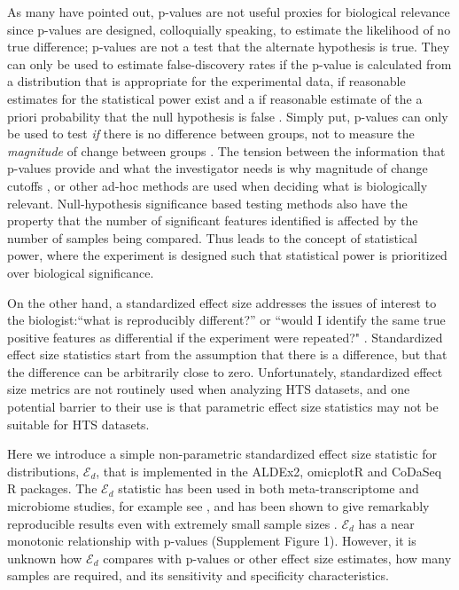 \documentclass{bioinfo}
\begin{document}

As many have pointed out, p-values are not useful proxies for biological relevance since p-values are designed, colloquially speaking, to estimate the likelihood of no true difference; p-values are not a test that the alternate hypothesis is true. They can only be used to estimate false-discovery rates if the p-value is calculated from a distribution that is appropriate for the experimental data, if reasonable estimates for the statistical power exist and a if reasonable estimate of the a priori probability that the null hypothesis is false \citep{Colquhoun:2014aa, Halsey:2015aa}. Simply put, p-values can only be used to test \emph{if} there is no difference between groups, not to measure the \emph{magnitude} of change between groups \citep{coe2002s,Colquhoun:2014aa}. The tension between the information that p-values provide and what the investigator needs is why magnitude of change cutoffs \citep{Cui:2003aa}, or other ad-hoc methods are used when deciding what is biologically relevant. Null-hypothesis significance based testing methods  also have the property that the number of significant features identified  is affected by the number of samples being compared. Thus leads to the concept of statistical power, where the experiment is designed such that statistical power is prioritized over biological significance. 

On the other hand, a standardized effect size addresses the issues of interest to the biologist:``what is reproducibly different?'' or ``would I identify the same true positive features as differential if the experiment were repeated?"  \citep{coe2002s,shinichi:2004,Colquhoun:2014aa,gloor:effect}. Standardized effect size statistics start from the assumption that there is a difference, but that the difference can be arbitrarily close to zero. Unfortunately,  standardized effect size metrics are not routinely used when analyzing HTS datasets, and one potential barrier to their use is that parametric effect size statistics may not be suitable for  HTS datasets.  

Here we introduce a simple non-parametric standardized effect size statistic for distributions, $\mathcal{E}_{d}$, that is implemented in the ALDEx2, omicplotR  and CoDaSeq R packages.  The $\mathcal{E}_{d}$ statistic has been used in both meta-transcriptome and microbiome studies, for example see \citep{macklaim:2013, bian:2017}, and has been shown to give remarkably reproducible results even with extremely small sample sizes \citep{nelson:2015vaginal}.   $\mathcal{E}_{d}$  has a near monotonic relationship with p-values (Supplement Figure 1). However, it is unknown how  $\mathcal{E}_{d}$  compares with  p-values or other effect size estimates, how many samples are required, and its sensitivity and specificity characteristics. 
\end{document}
